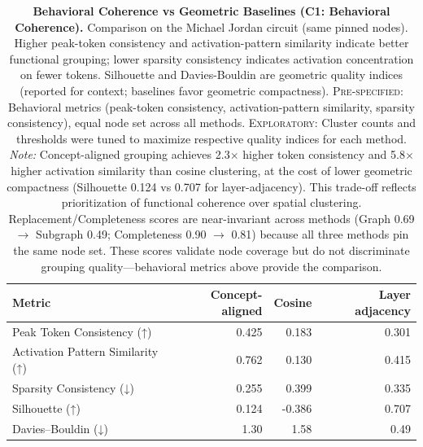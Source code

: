 \begin{table}[H]
\centering
\caption{\textbf{Behavioral Coherence vs Geometric Baselines (C1: Behavioral Coherence).} Comparison on the Michael Jordan circuit (same pinned nodes). Higher peak-token consistency and activation-pattern similarity indicate better functional grouping; lower sparsity consistency indicates activation concentration on fewer tokens. Silhouette and Davies-Bouldin are geometric quality indices (reported for context; baselines favor geometric compactness). \textsc{Pre-specified:} Behavioral metrics (peak-token consistency, activation-pattern similarity, sparsity consistency), equal node set across all methods. \textsc{Exploratory:} Cluster counts and thresholds were tuned to maximize respective quality indices for each method. \emph{Note:} Concept-aligned grouping achieves 2.3$\times$ higher token consistency and 5.8$\times$ higher activation similarity than cosine clustering, at the cost of lower geometric compactness (Silhouette 0.124 vs 0.707 for layer-adjacency). This trade-off reflects prioritization of functional coherence over spatial clustering. Replacement/Completeness scores are near-invariant across methods (Graph 0.69 $\rightarrow$ Subgraph 0.49; Completeness 0.90 $\rightarrow$ 0.81) because all three methods pin the same node set. These scores validate node coverage but do not discriminate grouping quality---behavioral metrics above provide the comparison.}
\label{tab:baselines}
\begin{tabular}{lrrr}
\toprule
\textbf{Metric} & \textbf{Concept-aligned} & \textbf{Cosine} & \textbf{Layer adjacency} \\
\midrule
Peak Token Consistency (↑)      & 0.425 & 0.183 & 0.301 \\
Activation Pattern Similarity (↑)& 0.762 & 0.130 & 0.415 \\
Sparsity Consistency (↓)         & 0.255 & 0.399 & 0.335 \\
Silhouette (↑)                   & 0.124 & -0.386 & 0.707 \\
Davies--Bouldin (↓)              & 1.30 & 1.58 & 0.49 \\
\bottomrule
\end{tabular}
\end{table}


